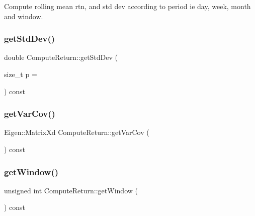 Compute rolling mean rtn, and std dev according to period ie day, week, month and window. 

\hypertarget{classComputeReturn_a7aac48c9abb168e956412bf9d509cb35}{}\label{classComputeReturn_a7aac48c9abb168e956412bf9d509cb35} 
\subsubsection{\texorpdfstring{get\+Std\+Dev()}{getStdDev()}}
{\footnotesize\ttfamily double Compute\+Return\+::get\+Std\+Dev (\begin{DoxyParamCaption}\item[{size\+\_\+t}]{p = {} }\end{DoxyParamCaption}) const}

\hypertarget{classComputeReturn_a3d312fabfda99b5405e7aeab2af2fc8c}{}\label{classComputeReturn_a3d312fabfda99b5405e7aeab2af2fc8c} 
\subsubsection{\texorpdfstring{get\+Var\+Cov()}{getVarCov()}}
{\footnotesize\ttfamily Eigen\+::\+Matrix\+Xd Compute\+Return\+::get\+Var\+Cov (\begin{DoxyParamCaption}{ }\end{DoxyParamCaption}) const\hspace{0.3cm}{\ttfamily [inline]}}

\hypertarget{classComputeReturn_a8b65977d4a7f929db92cf33c05428707}{}\label{classComputeReturn_a8b65977d4a7f929db92cf33c05428707} 
\subsubsection{\texorpdfstring{get\+Window()}{getWindow()}}
{\footnotesize\ttfamily unsigned int Compute\+Return\+::get\+Window (\begin{DoxyParamCaption}{ }\end{DoxyParamCaption}) const\hspace{0.3cm}{\ttfamily [inline]}}

\hypertarget{classComputeReturn_a6250a32e8ac308d3642bb81154ceb785}{}\label{classComputeReturn_a6250a32e8ac308d3642bb81154ceb785} 
